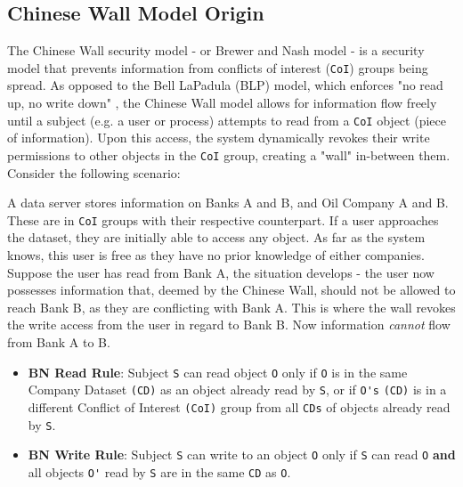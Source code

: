 \documentclass[11pt,titlepage,dvipsnames,table,xcdraw]{article}
\begin{document}
\subsection{Chinese Wall Model Origin}
The Chinese Wall security model - or Brewer and Nash model \cite{brewer_chinese_1989} - is a security model that prevents information from conflicts of interest (\verb_CoI_) groups being spread. 
As opposed to the Bell LaPadula (BLP) model, which enforces "no read up, no write down" \cite{bell_secure_1973}, the Chinese Wall model allows for information flow freely until a subject (e.g. a user or process) attempts to read
from a \verb_CoI_ object (piece of information). Upon this access, the system dynamically revokes their write permissions to other objects in the \verb_CoI_ group,
creating a "wall" in-between them. Consider the following scenario: 

A data server stores information on Banks A and B, and Oil Company A and B. These are in \verb_CoI_ groups with their respective counterpart. If a user approaches the dataset, they are initially able to access
any object. As far as the system knows, this user is free as they have no prior knowledge of either companies. Suppose the user has read from Bank A, the situation develops - the user now possesses
information that, deemed by the Chinese Wall, should not be allowed to reach Bank B, as they are conflicting with Bank A. This is where the wall revokes the write access from the user in regard to Bank B.
Now information \textit{cannot} flow from Bank A to B. 

\begin{itemize}
  \item \textbf{BN Read Rule}: Subject \verb_S_ can read object \verb_O_ only if \verb_O_ is in the same Company Dataset \verb_(CD)_ as an object already read by \verb_S_, or if \verb_O's_ \verb_(CD)_ is in a 
    different Conflict of Interest \verb_(CoI)_ group from all \verb_CDs_ of objects already read by \verb_S_.
  \item \textbf{BN Write Rule}: Subject \verb_S_ can write to an object \verb_O_ only if \verb_S_ can read \verb_O_ \textbf{and} all objects \verb_O'_ read by \verb_S_ are in the same \verb_CD_ as \verb_O_.

\end{itemize}
\end{document}
